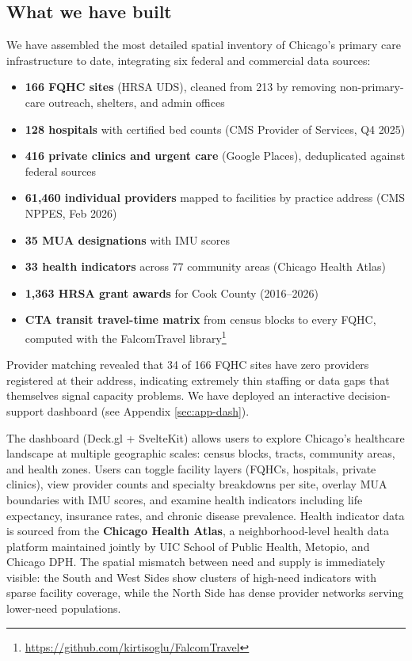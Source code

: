 \documentclass[11pt]{article}
\begin{document}
\subsection*{What we have built}

We have assembled the most detailed spatial inventory of Chicago's primary care infrastructure to date, integrating six federal and commercial data sources:

\begin{itemize}[nosep]
    \item \textbf{166 FQHC sites} (HRSA UDS), cleaned from 213 by removing non-primary-care outreach, shelters, and admin offices
    \item \textbf{128 hospitals} with certified bed counts (CMS Provider of Services, Q4 2025)
    \item \textbf{416 private clinics and urgent care} (Google Places), deduplicated against federal sources
    \item \textbf{61,460 individual providers} mapped to facilities by practice address (CMS NPPES, Feb 2026)
    \item \textbf{35 MUA designations} with IMU scores
    \item \textbf{33 health indicators} across 77 community areas (Chicago Health Atlas)
    \item \textbf{1,363 HRSA grant awards} for Cook County (2016--2026)
    \item \textbf{CTA transit travel-time matrix} from census blocks to every FQHC, computed with the FalcomTravel library\footnote{\url{https://github.com/kirtisoglu/FalcomTravel}}
\end{itemize}

Provider matching revealed that 34 of 166 FQHC sites have zero providers registered at their address, indicating extremely thin staffing or data gaps that themselves signal capacity problems. We have deployed an interactive decision-support dashboard (see Appendix \ref{sec:app-dash}).




The dashboard (Deck.gl + SvelteKit) allows users to explore Chicago's healthcare landscape at multiple geographic scales: census blocks, tracts, community areas, and health zones. Users can toggle facility layers (FQHCs, hospitals, private clinics), view provider counts and specialty breakdowns per site, overlay MUA boundaries with IMU scores, and examine health indicators including life expectancy, insurance rates, and chronic disease prevalence. Health indicator data is sourced from the \textbf{Chicago Health Atlas}, a neighborhood-level health data platform maintained jointly by UIC School of Public Health, Metopio, and Chicago DPH. The spatial mismatch between need and supply is immediately visible: the South and West Sides show clusters of high-need indicators with sparse facility coverage, while the North Side has dense provider networks serving lower-need populations.
\end{document}
